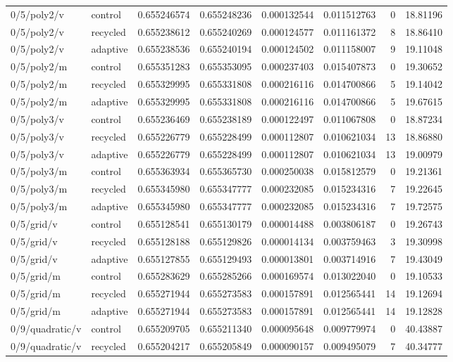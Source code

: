 \begin{longtable}{llrrrrrr}
0/5/poly2/v & control & 0.655246574 & 0.655248236 & 0.000132544 & 0.011512763 & 0 & 18.81196 \\
0/5/poly2/v & recycled & 0.655238612 & 0.655240269 & 0.000124577 & 0.011161372 & 8 & 18.86410 \\
0/5/poly2/v & adaptive & 0.655238536 & 0.655240194 & 0.000124502 & 0.011158007 & 9 & 19.11048 \\
0/5/poly2/m & control & 0.655351283 & 0.655353095 & 0.000237403 & 0.015407873 & 0 & 19.30652 \\
0/5/poly2/m & recycled & 0.655329995 & 0.655331808 & 0.000216116 & 0.014700866 & 5 & 19.14042 \\
0/5/poly2/m & adaptive & 0.655329995 & 0.655331808 & 0.000216116 & 0.014700866 & 5 & 19.67615 \\
0/5/poly3/v & control & 0.655236469 & 0.655238189 & 0.000122497 & 0.011067808 & 0 & 18.87234 \\
0/5/poly3/v & recycled & 0.655226779 & 0.655228499 & 0.000112807 & 0.010621034 & 13 & 18.86880 \\
0/5/poly3/v & adaptive & 0.655226779 & 0.655228499 & 0.000112807 & 0.010621034 & 13 & 19.00979 \\
0/5/poly3/m & control & 0.655363934 & 0.655365730 & 0.000250038 & 0.015812579 & 0 & 19.21361 \\
0/5/poly3/m & recycled & 0.655345980 & 0.655347777 & 0.000232085 & 0.015234316 & 7 & 19.22645 \\
0/5/poly3/m & adaptive & 0.655345980 & 0.655347777 & 0.000232085 & 0.015234316 & 7 & 19.72575 \\
0/5/grid/v & control & 0.655128541 & 0.655130179 & 0.000014488 & 0.003806187 & 0 & 19.26743 \\
0/5/grid/v & recycled & 0.655128188 & 0.655129826 & 0.000014134 & 0.003759463 & 3 & 19.30998 \\
0/5/grid/v & adaptive & 0.655127855 & 0.655129493 & 0.000013801 & 0.003714916 & 7 & 19.43049 \\
0/5/grid/m & control & 0.655283629 & 0.655285266 & 0.000169574 & 0.013022040 & 0 & 19.10533 \\
0/5/grid/m & recycled & 0.655271944 & 0.655273583 & 0.000157891 & 0.012565441 & 14 & 19.12694 \\
0/5/grid/m & adaptive & 0.655271944 & 0.655273583 & 0.000157891 & 0.012565441 & 14 & 19.12828 \\
0/9/quadratic/v & control & 0.655209705 & 0.655211340 & 0.000095648 & 0.009779974 & 0 & 40.43887 \\
0/9/quadratic/v & recycled & 0.655204217 & 0.655205849 & 0.000090157 & 0.009495079 & 7 & 40.34777 \\

\end{longtable}
